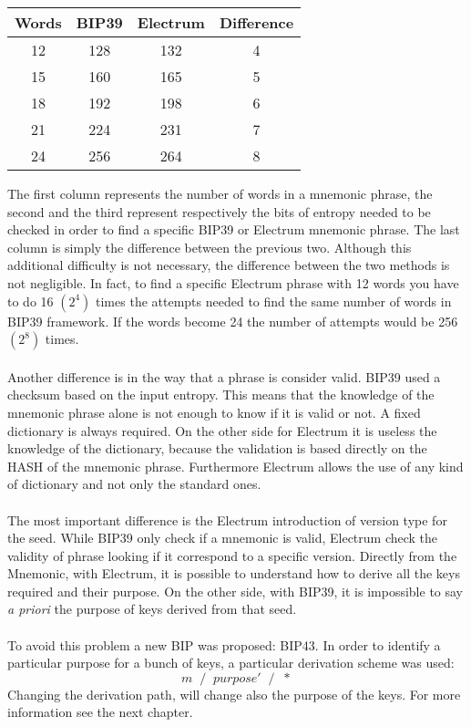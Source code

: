\begin{center}
	\begin{tabular}{|| c | c | c | c ||} 
		\hline
		Words & BIP39 & Electrum & Difference \\ [0.5ex] 
		\hline\hline
		12 & 128 & 132 & 4 \\ 
		
		15 & 160 & 165 & 5 \\
		
		18 & 192 & 198 & 6 \\
		
		21 & 224 & 231 & 7 \\
		
		24 & 256 & 264 & 8 \\ 
		\hline
	\end{tabular}
\end{center}
The first column represents the number of words in a mnemonic phrase, the second and the third represent respectively the bits of entropy needed to be checked in order to find a specific BIP39 or Electrum mnemonic phrase. The last column is simply the difference between the previous two. Although this additional difficulty is not necessary, the difference between the two methods is not negligible. In fact, to find a specific Electrum phrase with 12 words you have to do 16 $(2^4)$ times the attempts needed to find the same number of words in BIP39 framework. If the words become 24 the number of attempts would be 256 $(2^8)$ times.
\\ \\ 
Another difference is in the way that a phrase is consider valid. BIP39 used a checksum based on the input entropy. This means that the knowledge of the mnemonic phrase alone is not enough to know if it is valid or not. A fixed dictionary is always required. On the other side for Electrum it is useless the knowledge of the dictionary, because the validation is based directly on the HASH of the mnemonic phrase. Furthermore Electrum allows the use of any kind of dictionary and not only the standard ones.
\\ \\
The most important difference is the Electrum introduction of version type for the seed. While BIP39 only check if a mnemonic is valid, Electrum check the validity of phrase looking if it correspond to a specific version. Directly from the Mnemonic, with Electrum, it is possible to understand how to derive all the keys required and their purpose. On the other side, with BIP39, it is impossible to say \textit{a priori} the purpose of keys derived from that seed. 
\\ \\
To avoid this problem a new BIP was proposed: BIP43. In order to identify a particular purpose for a bunch of keys, a particular derivation scheme was used:
\begin{equation*}
m\; \;/\;\; purpose'\;\; /\;\; *
\end{equation*}
Changing the derivation path, will change also the purpose of the keys. For more information see the next chapter.










